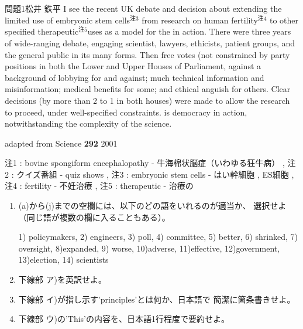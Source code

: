 \documentclass[fleqn]{jbook}
\begin{document}
\begin{question}{問題1}{松井 鉄平}
	I see the recent UK debate and decision about extending the limited 
use of embryonic stem cells$^{注3}$ from research on human fertility$^{注4}$ 
to other specified therapeutic$^{注5}$uses as a model for the 
 in action. There were three years of 
wide-ranging debate, engaging scientist, lawyers, ethicists, patient groups, 
and the general public in its many forms. Then free votes (not constrained by 
party positions in both the Lower and Upper Houses of Parliament, 
against a background of lobbying for and against; much technical information 
and misinformation; medical benefits for some; and ethical anguish for 
others. Clear decisions (by more than 2 to 1 in both houses) were made 
to allow the research to proceed, under well-specified constraints.
 is democracy in action, notwithstanding 
the complexity of the science.
\begin{flushright}
adapted from Science \textbf{292} 2001
\end{flushright}
\hspace*{0.5cm}
注1 : bovine spongiform encephalopathy - 牛海棉状脳症（いわゆる狂牛病） , 
注2 : クイズ番組 - quiz shows , 注3 : embryonic stem cells - はい幹細胞 , 
ES細胞 , 注4 : fertility - 不妊治療 , 注5 : therapeutic - 治療の

\begin{enumerate}
\item (a)から(j)までの空欄には、以下のどの語をいれるのが適当か、
選択せよ（同じ語が複数の欄に入ることもある）。

1) policymakers, 2) engineers, 3) poll, 4) committee, 5) better, 
6) shrinked, 7) oversight, 8)expanded, 9) worse, 10)adverse, 
11)effective, 12)government, 13)election, 14) scientists

\item 下線部 ア)を英訳せよ。

\item 下線部 イ)が指し示す'principles'とは何か、日本語で
簡潔に箇条書きせよ。

\item 下線部 ウ)の'This'の内容を、日本語1行程度で要約せよ。
\end{enumerate}
\end{question}
\end{document}
